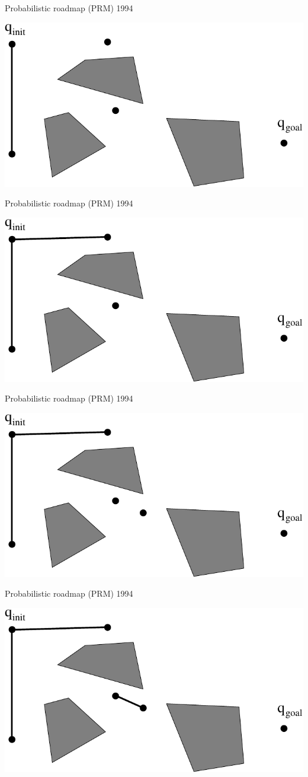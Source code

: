 \begin{frame} {Probabilistic roadmap (PRM) 1994}
\centerline {
  \includegraphics[width=.8\linewidth]{figures/PRM7.pdf}
}
\end{frame}

\begin{frame} {Probabilistic roadmap (PRM) 1994}
\centerline {
  \includegraphics[width=.8\linewidth]{figures/PRM8.pdf}
}
\end{frame}

\begin{frame} {Probabilistic roadmap (PRM) 1994}
\centerline {
  \includegraphics[width=.8\linewidth]{figures/PRM9.pdf}
}
\end{frame}

\begin{frame} {Probabilistic roadmap (PRM) 1994}
\centerline {
  \includegraphics[width=.8\linewidth]{figures/PRM10.pdf}
}
\end{frame}

